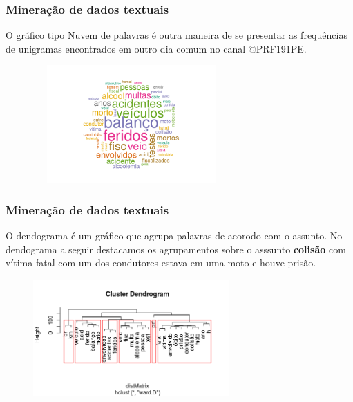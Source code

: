 \documentclass[11pt]{beamer}
\begin{document}
\begin{frame}
	\frametitle{Mineração de dados textuais}
	O gráfico tipo Nuvem de palavras é outra maneira de se presentar as frequências de unigramas encontrados em outro dia comum no canal @PRF191PE.
	\begin{figure}[ht]
		\centering
		\includegraphics[width=75mm, height=45mm]{Figuras/Twitter/nuvem2.png}\\
	\end{figure}
\end{frame}


\begin{frame}
	\frametitle{Mineração de dados textuais}
	O dendograma é um gráfico que agrupa palavras de acorodo com o assunto. No dendograma a seguir destacamos os agrupamentos sobre o asssunto \textbf{colisão} com vítima fatal com um dos condutores estava em uma moto e houve prisão.
	\begin{figure}[ht]
		\centering
		\includegraphics[width=75mm, height=45mm]{Figuras/Twitter/Cluster.png}\\
	\end{figure}
\end{frame}
\end{document}
